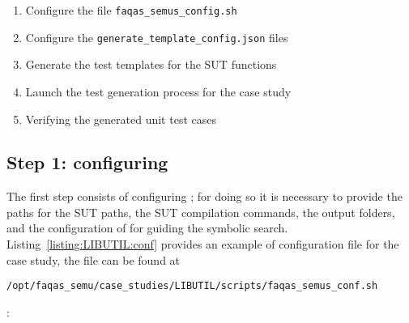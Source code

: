\begin{enumerate}
    \item Configure the file \texttt{faqas\_semus\_config.sh}
    \item Configure the \texttt{generate\_template\_config.json} files
    \item Generate the test templates for the SUT functions
    \item Launch the test generation process for the case study
    \item Verifying the generated unit test cases
\end{enumerate}


\subsection{Step 1: configuring \SEMUS}

The first step consists of configuring \SEMUS; for doing so it is necessary to provide the paths for the SUT paths, the SUT compilation commands, the output folders, and the configuration of \SEMU for guiding the symbolic search. Listing~\ref{listing:LIBUTIL:conf} provides an example of configuration file for the case study, the file can be found at \begin{footnotesize}\texttt{/opt/faqas\_semu/case\_studies/LIBUTIL/scripts/faqas\_semus\_conf.sh}\end{footnotesize}:

